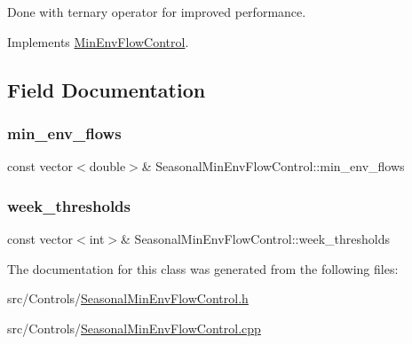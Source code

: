 Done with ternary operator for improved performance. 

Implements \mbox{\hyperlink{classMinEnvFlowControl_a5de79615852eb0c937dd559a9eb9402d_a5de79615852eb0c937dd559a9eb9402d}{Min\+Env\+Flow\+Control}}.



\subsection{Field Documentation}
\mbox{\label{classSeasonalMinEnvFlowControl_aa9225667157707da3230276d0de890ba_aa9225667157707da3230276d0de890ba}} 
\subsubsection{\texorpdfstring{min\+\_\+env\+\_\+flows}{min\_env\_flows}}
{\footnotesize\ttfamily const vector$<$double$>$\& Seasonal\+Min\+Env\+Flow\+Control\+::min\+\_\+env\+\_\+flows\hspace{0.3cm}{\ttfamily [private]}}

\mbox{\label{classSeasonalMinEnvFlowControl_adea056def640b4e799b8549383838317_adea056def640b4e799b8549383838317}} 
\subsubsection{\texorpdfstring{week\+\_\+thresholds}{week\_thresholds}}
{\footnotesize\ttfamily const vector$<$int$>$\& Seasonal\+Min\+Env\+Flow\+Control\+::week\+\_\+thresholds\hspace{0.3cm}{\ttfamily [private]}}



The documentation for this class was generated from the following files\+:\begin{DoxyCompactItemize}
\item 
src/\+Controls/\mbox{\hyperlink{SeasonalMinEnvFlowControl_8h}{Seasonal\+Min\+Env\+Flow\+Control.\+h}}\item 
src/\+Controls/\mbox{\hyperlink{SeasonalMinEnvFlowControl_8cpp}{Seasonal\+Min\+Env\+Flow\+Control.\+cpp}}\end{DoxyCompactItemize}

